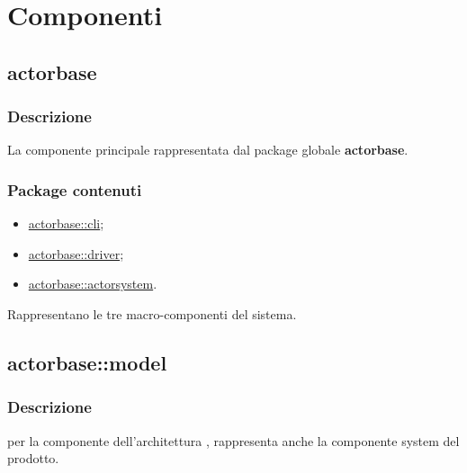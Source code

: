 \documentclass{scalatekids-article}
\begin{document}

\section{Componenti}

\subsection{actorbase}
\label{sec:actorbase}

\subsubsection{Descrizione}

La componente principale rappresentata dal package globale \textbf{actorbase}.

\subsubsection{Package contenuti}

\begin{itemize}
\item \hyperref[sec:actorbase::cli]{actorbase::cli};
\item \hyperref[sec:actorbase::driver]{actorbase::driver};
\item \hyperref[sec:actorbase::actorsystem]{actorbase::actorsystem}.
\end{itemize}

Rappresentano le tre macro-componenti del sistema.

\subsection{actorbase::model}
\label{sec:actorbase::model}

\subsubsection{Descrizione}

 per la componente  dell'architettura ,
rappresenta anche la componente system del prodotto.
\end{document}
